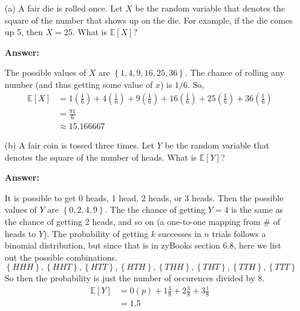 \documentclass[14pt]{extreport}
\newcommand{\answer}[0]{\medskip \textbf{Answer:} \medskip}
\newcommand{\E}[0]{\mathbb{E}}
\begin{document}
\begin{enumerate}
    
    \item[(a)] A fair die is rolled once. Let \( X \) be the random variable that denotes the square of the number that shows up on the die. For example, if the die comes up 5, then \( X = 25 \). What is \( \mathbb{E}[X] \)?
    
        \answer

        The possible values of \( X \) are \( \left\{ 1, 4, 9, 16, 25, 36 \right\} \). The chance of rolling any number (and thus getting some value of \( x \)) is \( 1 / 6 \). So,
        \begin{align*}
            \mathbb{E}[X] &= 1(\frac{1}{6}) + 4(\frac{1}{6}) + 9(\frac{1}{6}) + 16(\frac{1}{6}) + 25(\frac{1}{6}) + 36(\frac{1}{6}) \\
                 &= \frac{91}{6} \\
                 &\approx 15.166667
        \end{align*}

    \item[(b)] A fair coin is tossed three times. Let \( Y \) be the random variable that denotes the square of the number of heads. What is \( \mathbb{E}[Y] \)?
    
        \answer

        It is possible to get 0 heads, 1 head, 2 heads, or 3 heads. Then the possible values of \( Y \) are \( \left\{ 0, 2, 4, 9 \right\} \). The the chance of getting \( Y = 4 \) is the same as the chance of getting 2 heads, and so on (a one-to-one mapping from \# of heads to \( Y \)). The probability of getting \( k \) successes in \( n \) trials follows a binomial distribution, but since that is in zyBooks section 6.8, here we list out the possible combinations.
        \[
            \left\{ HHH \right\},
            \left\{ HHT \right\},
            \left\{ HTT \right\},
            \left\{ HTH \right\},
            \left\{ THH \right\},
            \left\{ THT \right\},
            \left\{ TTH \right\},
            \left\{ TTT \right\}
        \]
        So then the probability is just the number of occurences divided by 8.
        \begin{align*}
            \E[Y] &= 0(p) + 1 \frac{3}{8} + 2 \frac{3}{8} + 3 \frac{1}{8} \\
                  &= 1.5
        \end{align*}

\end{enumerate}
\end{document}
